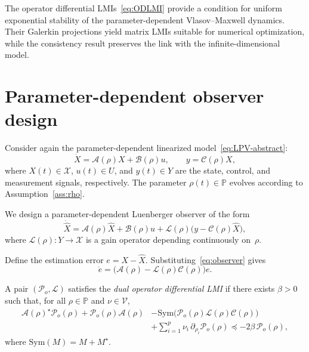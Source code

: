 \documentclass[AMA,Times2COL]{WileyNJDv5}
\begin{document}
The operator differential LMIs~\eqref{eq:ODLMI} provide a condition for uniform exponential stability of the parameter-dependent Vlasov--Maxwell dynamics.
Their Galerkin projections yield matrix LMIs suitable for numerical optimization, while the consistency result preserves the link with the infinite-dimensional model.

\section{Parameter-dependent observer design}
\label{sec:observer}

Consider again the parameter-dependent linearized model~\eqref{eq:LPV-abstract}:
\[
\dot X = \mathcal{A}(\rho) X + \mathcal{B}(\rho) u,
\qquad y = \mathcal{C}(\rho) X,
\]
where $X(t)\in \mathscr{X}$, $u(t)\in U$, and $y(t)\in Y$ are the state, control, and measurement signals, respectively.
The parameter $\rho(t)\in\mathbb{P}$ evolves according to
Assumption~\ref{ass:rho}.

We design a parameter-dependent Luenberger observer of the form
\begin{equation}\label{eq:observer}
\dot{\hat X}
= \mathcal{A}(\rho)\hat X + \mathcal{B}(\rho)u
+ \mathcal{L}(\rho)\big(y-\mathcal{C}(\rho)\hat X\big),
\end{equation}
where $\mathcal{L}(\rho):Y\to \mathscr{X}$ is a gain operator depending continuously on~$\rho$.

Define the estimation error $e=X-\hat X$.
Substituting~\eqref{eq:observer} gives
\begin{equation}\label{eq:error}
\dot e =
\big(\mathcal{A}(\rho)-\mathcal{L}(\rho)\mathcal{C}(\rho)\big)e .
\end{equation}

\begin{definition}\label{def:dualODLMI}
A pair $(\mathcal{P}_o,\mathcal{L})$ satisfies the \emph{dual operator
differential LMI} if there exists $\beta>0$ such that, for all
$\rho\in\mathbb{P}$ and $\nu\in\mathcal{V}$,
\begin{align}\label{eq:dualODLMI}
\mathcal{A}(\rho)^{\star}\mathcal{P}_o(\rho)
+
\mathcal{P}_o(\rho)\mathcal{A}(\rho)
&-
\mathrm{Sym}\!\big(
\mathcal{P}_o(\rho)\mathcal{L}(\rho)\mathcal{C}(\rho)
\big)\nonumber\\
&+
\sum_{i=1}^p \nu_i\,\partial_{\rho_i}\mathcal{P}_o(\rho)
\preceq
-2\beta\,\mathcal P_o(\rho),
\end{align}
where $\mathrm{Sym}(M)=M+M^{\star}$.
\end{definition}
\end{document}
